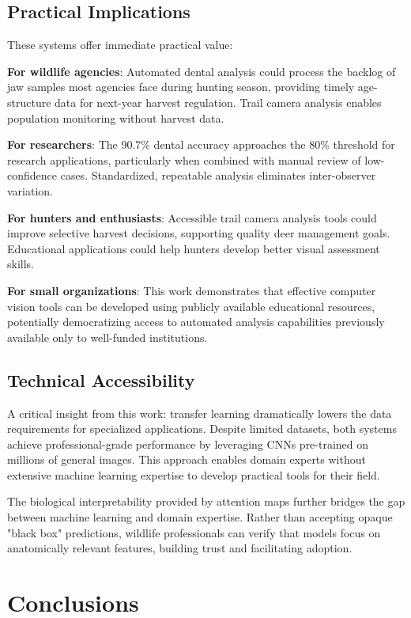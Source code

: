 \documentclass{iopjournal}
\begin{document}
\subsection{Practical Implications}

These systems offer immediate practical value:

\textbf{For wildlife agencies}: Automated dental analysis could process the backlog of jaw samples most agencies face during hunting season, providing timely age-structure data for next-year harvest regulation. Trail camera analysis enables population monitoring without harvest data.

\textbf{For researchers}: The 90.7\% dental accuracy approaches the 80\% threshold for research applications, particularly when combined with manual review of low-confidence cases. Standardized, repeatable analysis eliminates inter-observer variation.

\textbf{For hunters and enthusiasts}: Accessible trail camera analysis tools could improve selective harvest decisions, supporting quality deer management goals. Educational applications could help hunters develop better visual assessment skills.

\textbf{For small organizations}: This work demonstrates that effective computer vision tools can be developed using publicly available educational resources, potentially democratizing access to automated analysis capabilities previously available only to well-funded institutions.

\subsection{Technical Accessibility}

A critical insight from this work: transfer learning dramatically lowers the data requirements for specialized applications. Despite limited datasets, both systems achieve professional-grade performance by leveraging CNNs pre-trained on millions of general images. This approach enables domain experts without extensive machine learning expertise to develop practical tools for their field.

The biological interpretability provided by attention maps further bridges the gap between machine learning and domain expertise. Rather than accepting opaque "black box" predictions, wildlife professionals can verify that models focus on anatomically relevant features, building trust and facilitating adoption.

\section{Conclusions}
\end{document}
